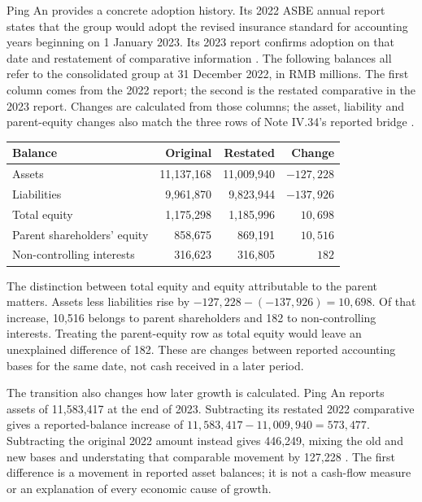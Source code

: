 Ping An provides a concrete adoption history. Its 2022 ASBE annual report
states that the group would adopt the revised insurance standard for accounting
years beginning on 1 January 2023. Its 2023 report confirms adoption on that
date and restatement of comparative information
\citep[Note XIV.2, pp.~315--316]{pingan2022asbe}
\citep[Note IV.34, p.~192]{pingan2023asbe}. The following balances all refer
to the consolidated group at 31 December 2022, in RMB millions. The first
column comes from the 2022 report; the second is the restated comparative in
the 2023 report. Changes are calculated from those columns; the asset,
liability and parent-equity changes also match the three rows of Note IV.34's
reported bridge \citep[pp.~146--148]{pingan2022asbe}
\citep[pp.~141--143 and 192]{pingan2023asbe}.

\begin{center}
\small
\begin{tabularx}{\linewidth}{@{}Xrrr@{}}
\toprule
Balance & Original & Restated & Change\\
\midrule
Assets & 11,137,168 & 11,009,940 & $-127,228$\\
Liabilities & 9,961,870 & 9,823,944 & $-137,926$\\
Total equity & 1,175,298 & 1,185,996 & $10,698$\\
Parent shareholders' equity & 858,675 & 869,191 & $10,516$\\
Non-controlling interests & 316,623 & 316,805 & $182$\\
\bottomrule
\end{tabularx}
\end{center}

The distinction between total equity and equity attributable to the parent
matters. Assets less liabilities rise by
$-127,228-(-137,926)=10,698$. Of that increase, 10,516 belongs to parent
shareholders and 182 to non-controlling interests. Treating the parent-equity
row as total equity would leave an unexplained difference of 182. These are
changes between reported accounting bases for the same date, not cash received
in a later period.

The transition also changes how later growth is calculated. Ping An reports
assets of 11,583,417 at the end of 2023. Subtracting its restated 2022
comparative gives a reported-balance increase of
$11,583,417-11,009,940=573,477$. Subtracting the original 2022 amount instead
gives 446,249, mixing the old and new bases and understating that comparable
movement by 127,228 \citep[p.~141]{pingan2023asbe}. The first difference is
a movement in reported asset balances; it is not a cash-flow measure or an
explanation of every economic cause of growth.

